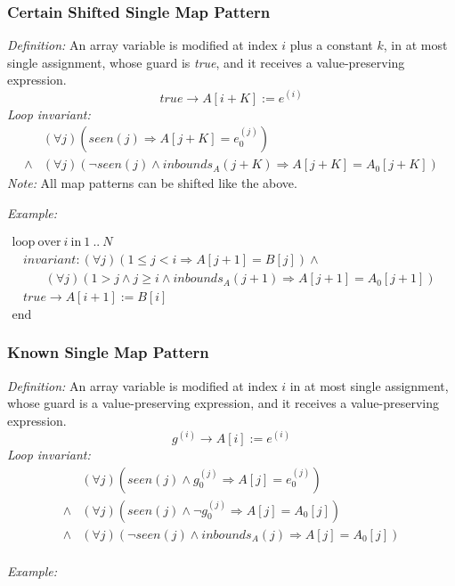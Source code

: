 \documentclass[a4paper,10pt]{article}
\newcommand{\idx}{\ensuremath{i}\xspace}
\newcommand{\at}[1]{{(#1)}}
\newcommand{\KWloop}{\ensuremath{\mathrm{loop}~}}
\newcommand{\KWend}{\ensuremath{\mathrm{end}~}}
\newcommand{\KWover}{\ensuremath{\mathrm{over}~}}
\newcommand{\KWin}{\ensuremath{~\mathrm{in}~}}
\newcommand{\impl}{\ensuremath{\Longrightarrow}}
\newcommand{\inbounds}[2]{\ensuremath{\mathit{inbounds}_{#1}(#2)}\xspace}
\newcommand{\seen}[1]{\ensuremath{\mathit{seen}(#1)}\xspace}
\newcommand{\loopinvariant}{\noindent\textit{Loop invariant:}\xspace}
\newcommand{\patterndef}{\noindent\textit{Definition:}\xspace}
\newcommand{\patternexample}{\noindent\textit{Example:}\xspace}
\newcommand{\patternnote}{\noindent\textit{Note:}\xspace}
\begin{document}
\subsubsection*{Certain Shifted Single Map Pattern}

\patterndef An array variable is modified at index \idx plus a constant $k$, in at most single assignment, 
whose guard is \textit{true}, and it receives a value-preserving expression.
%
$$\mathit{true} \rightarrow A[\idx + K] := e^\at{\idx}$$
%
\loopinvariant
%
\begin{eqnarray*}
&(\forall j)(\seen{j} \impl A[j + K] = e_0^\at{j}) \\
\land& (\forall j)(\neg \seen{j} \land \inbounds{A}{j + K} \impl A[j + K] = A_0[j + K])
\end{eqnarray*}
%
\patternnote All map patterns can be shifted like the above.

\bigskip
\patternexample

\medskip
$\begin{array}{l}
  \KWloop \KWover i \KWin 1~..~N \\
  ~~~~ \textit{invariant}: (\forall j)(1 \leq j < i \impl A[j+1] = B[j]) \land\\
  ~~~~~~~~~~~~ (\forall j)(1 > j \land j \geq i \land \inbounds{A}{j+1} \impl A[j+1] = A_0[j+1])\\
  ~~~~ true \rightarrow A[i+1] := B[i]\\
  \KWend
\end{array}$

\subsubsection*{Known Single Map Pattern}

\patterndef An array variable is modified at index \idx in at most single assignment, whose
guard is a value-preserving expression, and it receives a value-preserving expression.
%
$$g^\at{\idx} \rightarrow A[\idx] := e^\at{\idx}$$
%
\loopinvariant
%
\begin{eqnarray*}
&(\forall j)(\seen{j} \land g_0^\at{j} \impl A[j] = e_0^\at{j}) \\
\land&(\forall j)(\seen{j} \land \neg g_0^\at{j} \impl A[j] = A_0[j]) \\
\land&
 (\forall j)(\neg \seen{j} \land \inbounds{A}{j} \impl A[j] = A_0[j])\\
\end{eqnarray*}

\bigskip
\patternexample
\end{document}
